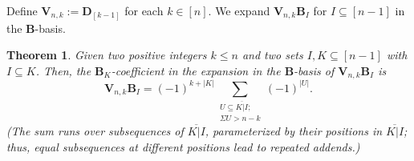 \documentclass[revision]{FPSAC2025}
\newtheorem{theorem}{Theorem}
\newtheorem{defn}{Definition}
\newcommand{\w}{\omega}
\begin{document}
%
%


\noindent Define $\mathbf{V}_{n,k}:=\mathbf{D}_{\left[  k-1\right]  }$ for each $k \in \left[n\right]$. We expand $\mathbf{V}_{n,k}\mathbf{B}_I$ for $I\subseteq [n-1]$ in the  $\mathbf{B}$-basis.
%
\begin{theorem}
\label{thm.vnk}
Given two positive integers $k\leq n$ and two sets $I,K \subseteq [n-1]$ with $I \subseteq K$.
Then, the $\mathbf{B}_K$-coefficient in the expansion in the $\mathbf{B}$-basis of $\mathbf{V}_{n,k}\mathbf{B}_I$ is 
\begin{equation}
[\mathbf{B}_K]\mathbf{V}_{n,k}\mathbf{B}_I = (-1)^{k + |K|}\sum_{\substack{U \subseteq \overline{ K|I};\\ \Sigma U > n-k} }(-1)^{|U|}.
\end{equation}
(The sum runs over subsequences of $\overline{ K|I}$, parameterized by their positions in $\overline{ K|I}$; thus, equal subsequences at different positions lead to repeated addends.)
\end{theorem}
\end{document}
